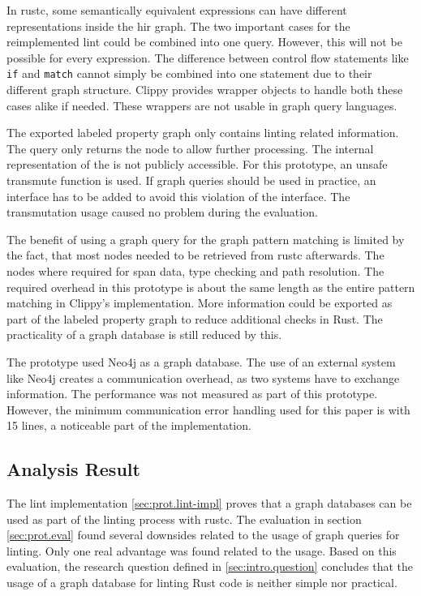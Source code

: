 In rustc, some semantically equivalent expressions can have different representations inside the \acrshort{hir} graph. The two important cases for the reimplemented lint could be combined into one query. However, this will not be possible for every expression. The difference between control flow statements like \texttt{if} and \texttt{match} cannot simply be combined into one statement due to their different graph structure. Clippy provides wrapper objects to handle both these cases alike if needed. These wrappers are not usable in graph query languages.

The exported labeled property graph only contains linting related information. The query only returns the node  to allow further processing. The internal representation of the  is not publicly accessible. For this prototype, an unsafe transmute function is used. If graph queries should be used in practice, an interface has to be added to avoid this violation of the interface. The transmutation usage caused no problem during the evaluation.

The benefit of using a graph query for the graph pattern matching is limited by the fact, that most nodes needed to be retrieved from rustc afterwards. The nodes where required for span data, type checking and path resolution. The required overhead in this prototype is about the same length as the entire pattern matching in Clippy's implementation. More information could be exported as part of the labeled property graph to reduce additional checks in Rust. The practicality of a graph database is still reduced by this.

The prototype used Neo4j as a graph database. The use of an external system like Neo4j creates a communication overhead, as two systems have to exchange information. The performance was not measured as part of this prototype. However, the minimum communication error handling used for this paper is with 15 lines, a noticeable part of the implementation.

\subsection{Analysis Result}

The lint implementation \ref{sec:prot.lint-impl} proves that a graph databases can be used as part of the linting process with rustc. The evaluation in section \ref{sec:prot.eval} found several downsides related to the usage of graph queries for linting. Only one real advantage was found related to the usage. Based on this evaluation, the research question defined in \ref{sec:intro.question} concludes that the usage of a graph database for linting Rust code is neither simple nor practical.
